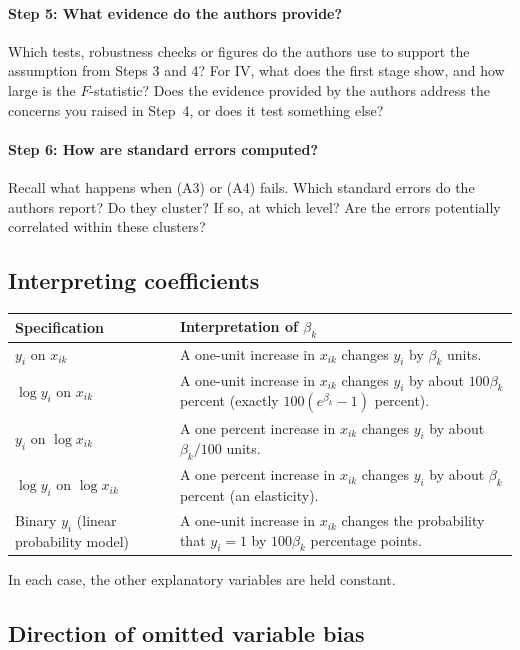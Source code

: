 \documentclass[12pt,a4paper]{article}
\begin{document}
\paragraph{Step 5: What evidence do the authors provide?}
Which tests, robustness checks or figures do the authors use to support the assumption from Steps 3 and 4? For IV, what does the first stage show, and how large is the $F$-statistic? Does the evidence provided by the authors address the concerns you raised in Step~4, or does it test something else?
 
\paragraph{Step 6: How are standard errors computed?}
Recall what happens when (A3) or (A4) fails. Which standard errors do the authors report? Do they cluster? If so, at which level? Are the errors potentially correlated within these clusters?
 
\subsection{Interpreting coefficients}
 
\begin{tabularx}{\textwidth}{@{}P{0.3\textwidth}L@{}}
\toprule
\textbf{Specification} & \textbf{Interpretation of $\beta_k$} \\
\midrule
$y_i$ on $x_{ik}$ & A one-unit increase in $x_{ik}$ changes $y_i$ by $\beta_k$ units. \\
$\log y_i$ on $x_{ik}$ & A one-unit increase in $x_{ik}$ changes $y_i$ by about $100\beta_k$ percent (exactly $100(e^{\beta_k}-1)$ percent). \\
$y_i$ on $\log x_{ik}$ & A one percent increase in $x_{ik}$ changes $y_i$ by about $\beta_k/100$ units. \\
$\log y_i$ on $\log x_{ik}$ & A one percent increase in $x_{ik}$ changes $y_i$ by about $\beta_k$ percent (an elasticity). \\
Binary $y_i$ (linear probability model) & A one-unit increase in $x_{ik}$ changes the probability that $y_i = 1$ by $100\beta_k$ percentage points. \\
\bottomrule
\end{tabularx}
 
In each case, the other explanatory variables are held constant.

\subsection{Direction of omitted variable bias}
\end{document}
